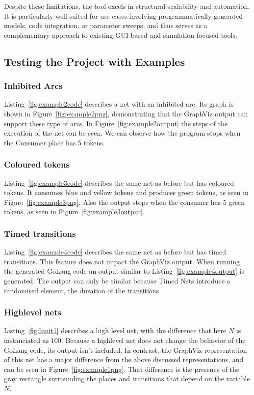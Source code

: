 \documentclass[12pt]{article}
\begin{document}
            Despite these limitations, the tool excels in structural scalability and automation. It is particularly well-suited for use cases involving programmatically generated models, code integration, or parameter sweeps, and thus serves as a complementary approach to existing GUI-based and simulation-focused tools.
    \subsection{Testing the Project with Examples}
        \subsubsection{Inhibited Arcs}
            Listing~\ref{fig:example2code} describes a net with an inhibited arc. Its graph is shown in Figure~\ref{fig:example2png}, demonstrating that the GraphViz output can support these type of arcs. In Figure~\ref{fig:example2output} the steps of the execution of the net can be seen. We can observe how the program stops when the Consumer place has 5 tokens. 
        \subsubsection{Coloured tokens}
            Listing~\ref{fig:example3code} describes the same net as before but has coloured tokens. It consumes blue and yellow tokens and produces green tokens, as seen in Figure~\ref{fig:example3png}. Also the output stops when the consumer has 5 green tokens, as seen in Figure~\ref{fig:example3output}.
        \subsubsection{Timed transitions}
            Listing~\ref{fig:example4code} describes the same net as before but has timed transitions. This feature does not impact the GraphViz output. When running the generated GoLang code an output similar to Listing~\ref{fig:example4output} is generated. The output can only be similar because Timed Nets introduce a randomised element, the duration of the transitions. 
        \subsubsection{Highlevel nets}
            Listing~\ref{fig:limit1} describes a high level net, with the difference that here $N$ is instanciated as $100$. Because a highlevel net does not change the behavior of the GoLang code, its output isn't included. In contrast, the GraphViz representation of this net has a major difference from the above discussed representations, and can be seen in Figure~\ref{fig:example1png}. That difference is the presence of the gray rectangle surrounding the places and transitions that depend on the variable $N$.  
\end{document}

